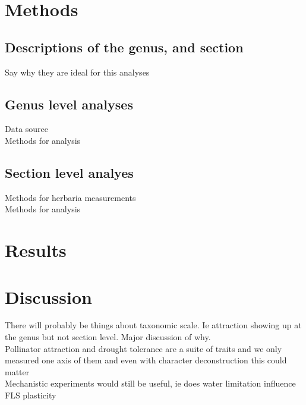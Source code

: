 \documentclass{article}\usepackage[]{graphicx}\usepackage[]{color}
\begin{document}


\section*{Methods}
\subsection{Descriptions of the genus, and section}
Say why they are ideal for this analyses
\subsection{Genus level analyses}
Data source\\
Methods for analysis\\

\subsection{Section level analyes}
Methods for herbaria measurements\\
Methods for analysis\\
\pagebreak

\section*{Results}

\section*{Discussion}
There will probably be things about taxonomic scale. Ie attraction showing up at the genus but not section level. Major discussion of why. \\
Pollinator attraction and drought tolerance are a suite of traits and we only measured one axis of them and even with character deconstruction this could matter\\
Mechanistic experiments would still be useful, ie does water limitation influence FLS plasticity
\newpage
\end{document}
